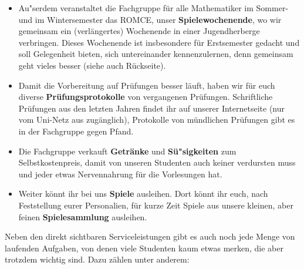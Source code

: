 \begin{itemize}
\item
Au"serdem veranstaltet die Fachgruppe für alle Mathematiker
im Sommer- und im Wintersemester das ROMCE, unser {\bf Spielewochenende},
wo wir gemeinsam ein (verlängertes) Wochenende in einer Jugendherberge verbringen.
Dieses Wochenende ist insbesondere für Erstsemester
gedacht und soll Gelegenheit bieten, sich untereinander kennenzulernen,
denn gemeinsam geht vieles besser
(siehe auch Rückseite).

\item
Damit die Vorbereitung auf Prüfungen besser läuft,
haben wir für euch diverse {\bf Prüfungsprotokolle} von vergangenen Prüfungen.
Schriftliche Prüfungen aus den letzten Jahren
findet ihr auf unserer Internetseite (nur vom Uni-Netz aus zugänglich),
Protokolle von mündlichen Prüfungen gibt es in der Fachgruppe gegen Pfand.

\item
Die Fachgruppe verkauft  {\bf Getränke} und {\bf Sü"sigkeiten}
zum Selbstkostenpreis, damit von unseren Studenten
auch keiner verdursten muss und jeder etwas Nervennahrung für die Vorlesungen hat.

\item
Weiter könnt ihr bei uns {\bf Spiele} ausleihen.
Dort könnt ihr euch, nach Feststellung eurer Personalien,
für kurze Zeit Spiele aus unsere kleinen,
aber feinen {\bf Spielesammlung} ausleihen.
\end{itemize}

Neben den direkt sichtbaren Serviceleistungen gibt es
auch noch jede Menge von laufenden Aufgaben,
von denen viele Studenten kaum etwas merken,
die aber trotzdem wichtig sind. Dazu zählen unter anderem:

